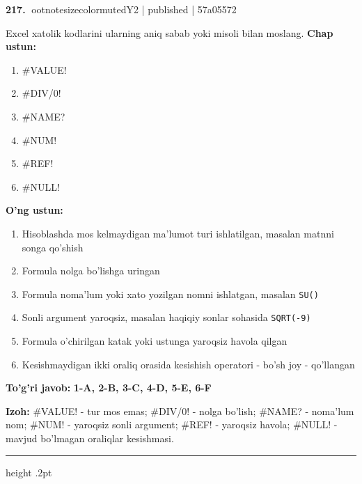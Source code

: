 \documentclass[10pt,a4paper]{article}
\begin{document}
\textbf{\color{ink}217.} {ootnotesizecolor{muted}Y2 | published | 57a05572}
\par
Excel xatolik kodlarini ularning aniq sabab yoki misoli bilan moslang.
\textbf{Chap ustun:}\begin{enumerate}[label=\arabic*),leftmargin=9mm]
\item \#VALUE!
\item \#DIV/0!
\item \#NAME?
\item \#NUM!
\item \#REF!
\item \#NULL!
\end{enumerate}
\textbf{O'ng ustun:}\begin{enumerate}[label=\Alph*),leftmargin=9mm]
\item Hisoblashda mos kelmaydigan ma'lumot turi ishlatilgan, masalan matnni songa qo'shish
\item Formula nolga bo'lishga uringan
\item Formula noma'lum yoki xato yozilgan nomni ishlatgan, masalan \texttt{SU()}
\item Sonli argument yaroqsiz, masalan haqiqiy sonlar sohasida \texttt{SQRT(-9)}
\item Formula o'chirilgan katak yoki ustunga yaroqsiz havola qilgan
\item Kesishmaydigan ikki oraliq orasida kesishish operatori - bo'sh joy - qo'llangan
\end{enumerate}
\begin{tcolorbox}[enhanced,breakable,colback=teal!4,colframe=teal!55!black,boxrule=0.45pt,arc=1.2mm,left=2.8mm,right=2.8mm,top=2mm,bottom=2mm]
\textbf{\color{teal}To'g'ri javob:} \textbf{1-A, 2-B, 3-C, 4-D, 5-E, 6-F}
\par\smallskip
\textbf{Izoh:} \#VALUE! - tur mos emas; \#DIV/0! - nolga bo'lish; \#NAME? - noma'lum nom; \#NUM! - yaroqsiz sonli argument; \#REF! - yaroqsiz havola; \#NULL! - mavjud bo'lmagan oraliqlar kesishmasi.
\end{tcolorbox}
\vspace{2mm}\hrule height .2pt\vspace{2mm}
\end{document}
